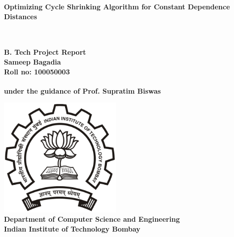 \begin{titlepage}
\begin{center}

{\Huge \bfseries
Optimizing Cycle Shrinking Algorithm for Constant Dependence Distances\\
}~\\[1cm]


{\large

}~\\[0.20cm]

{\Large \bfseries
B. Tech Project Report
}\\[2.75cm]

{\Large \bfseries
Sameep Bagadia\\
Roll no: 100050003\\

~\\
under the guidance of Prof. Supratim Biswas
}~\\[1cm]

\vfill

\includegraphics[width=6cm]{Figures/logo.png}~\\[1cm]

{\large \bfseries
Department of Computer Science and Engineering\\
Indian Institute of Technology Bombay\\
}

\end{center}
\end{titlepage}